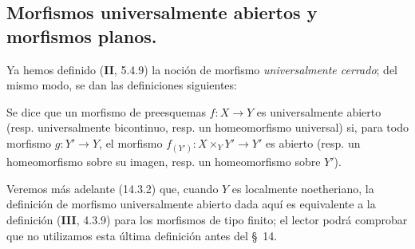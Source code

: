 \subsection{Morfismos universalmente abiertos y morfismos planos.}

\begin{env}[2.4.1]
\label{IV.2.4.1-fr}
Ya hemos definido (\textbf{II}, 5.4.9) la noción de morfismo
\emph{universalmente cerrado}; del mismo modo, se dan las definiciones siguientes:
\end{env}

\begin{definition}[2.4.2]
\label{IV.2.4.2-fr}
Se dice que un morfismo de preesquemas $f:X\to Y$ es universalmente
abierto \textup{(resp.} universalmente bicontinuo, \textup{resp.} un
homeomorfismo universal) si, para todo morfismo $g:Y'\to Y$, el
morfismo $f_{(Y')}:X\times_Y Y'\to Y'$ es abierto \textup{(resp.} un homeomorfismo
sobre su imagen, \textup{resp.} un homeomorfismo sobre $Y'$).
\end{definition}

Veremos más adelante (14.3.2) que, cuando $Y$ es localmente noetheriano, la
definición de morfismo universalmente abierto dada aquí es equivalente a la
definición (\textbf{III}, 4.3.9) para los morfismos de tipo finito; el lector podrá
comprobar que no utilizamos esta última definición antes del \S~14.

